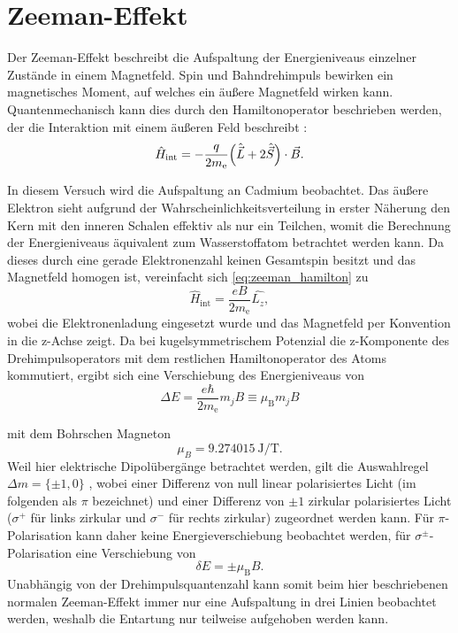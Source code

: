 \section{Zeeman-Effekt}\label{sec:zeeman}
Der Zeeman-Effekt beschreibt die Aufspaltung der Energieniveaus einzelner Zustände 
in einem Magnetfeld. Spin und Bahndrehimpuls bewirken ein magnetisches Moment, auf welches 
ein äußere Magnetfeld wirken kann. Quantenmechanisch kann dies durch den Hamiltonoperator 
beschrieben werden, der die Interaktion mit einem äußeren Feld beschreibt \cite{Sakurai}:
\begin{equation}
    \hat H_\mathrm{int} = -\frac{q}{2m_\mathrm e}\qty(\hat{\vec L} + 2\hat{\vec S})\cdot \vec B.
    \label{eq:zeeman_hamilton}
\end{equation}

In diesem Versuch wird die Aufspaltung an Cadmium beobachtet. Das äußere Elektron sieht 
aufgrund der Wahrscheinlichkeitsverteilung in erster Näherung den Kern mit den inneren 
Schalen effektiv als nur ein Teilchen, womit die Berechnung der Energieniveaus 
äquivalent zum Wasserstoffatom betrachtet werden kann. Da dieses durch eine gerade 
Elektronenzahl keinen Gesamtspin 
besitzt und das Magnetfeld homogen ist, vereinfacht sich \cref{eq:zeeman_hamilton} zu 
\begin{equation*}
    \hat H_\mathrm{int} = \frac{eB}{2m_\mathrm e}\hat{L_z},
\end{equation*}
wobei die Elektronenladung eingesetzt wurde und das Magnetfeld per Konvention in die z-Achse zeigt.
Da bei kugelsymmetrischem Potenzial die z-Komponente des Drehimpulsoperators mit dem restlichen Hamiltonoperator
des Atoms kommutiert, ergibt sich eine Verschiebung des Energieniveaus von
\begin{equation*}
    \Delta E = \frac{e\hbar}{2m_\mathrm e}m_jB \equiv \mu_\mathrm B m_j B
    \label{eq:energy_zeeman}
\end{equation*}

mit dem Bohrschen Magneton \cite{Demtröder:829119}
\begin{equation}
    \mu_B = \SI{9.274015}{\joule\per\tesla}.
    \label{eq:magneton}
\end{equation}
Weil hier elektrische Dipolübergänge betrachtet werden, gilt die Auswahlregel 
$\Delta m = \{\pm 1, 0\}$ \cite{Demtröder:829119}, wobei einer Differenz 
von null linear polarisiertes Licht (im folgenden als $\pi$ bezeichnet) und einer Differenz von $\pm 1$
zirkular polarisiertes Licht ($\sigma^+$ für links zirkular und $\sigma^-$ für rechts zirkular) 
zugeordnet werden kann.
Für $\pi$-Polarisation kann daher keine Energieverschiebung beobachtet werden, für 
$\sigma^\pm$-Polarisation eine Verschiebung von 
\begin{equation}
    \delta E = \pm \mu_\mathrm B B
    \label{eq:normal_zeeman}.
\end{equation}
Unabhängig von der Drehimpulsquantenzahl kann somit beim hier beschriebenen 
normalen Zeeman-Effekt immer nur eine Aufspaltung in drei Linien beobachtet werden,
weshalb die Entartung nur teilweise aufgehoben werden kann.

